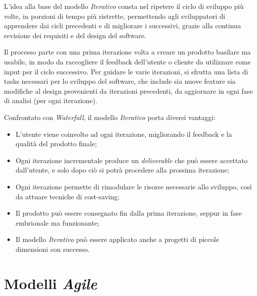 \documentclass[a4paper,12pt]{report}
\begin{document}
				\vspace{5mm}
				L'idea alla base del modello \emph{Iterativo} consta nel ripetere il ciclo di sviluppo più volte, in porzioni di tempo più ristrette,
				permettendo agli sviluppatori di apprendere dai cicli precedenti e di migliorare i successivi, grazie alla continua
				revisione dei requisiti e del design del software.
				
				\vspace{5mm}
				Il processo parte con una prima iterazione volta a creare un prodotto basilare ma usabile, in modo da raccogliere il feedback
				dell'utente o cliente da utilizzare come input per il ciclo successivo. Per guidare le varie iterazioni, si sfrutta una lista
				di tasks necessari per lo sviluppo del software, che include sia nuove feature sia modifiche al design provenienti da iterazioni
				precedenti, da aggiornare in ogni fase di analisi (per ogni iterazione).
				
				Confrontato con \emph{Waterfall}, il modello \emph{Iterativo} porta diversi vantaggi:
				\begin{itemize}
					\item L'utente viene coinvolto ad ogni iterazione, migliorando il feedback e la qualità del prodotto finale;
					\item Ogni iterazione incrementale produce un \emph{deliverable} che può essere accettato dall'utente, e solo dopo ciò si potrà procedere alla prossima iterazione;
					\item Ogni iterazione permette di rimodulare le risorse necessarie allo sviluppo, così da attuare tecniche di cost-saving;
					\item Il prodotto può essere consegnato fin dalla prima iterazione, seppur in fase embrionale ma funzionante;
					\item Il modello \emph{Iterativo} può essere applicato anche a progetti di piccole dimensioni con successo.
				\end{itemize}
	
		\section{Modelli \emph{Agile}}
	
\end{document}

